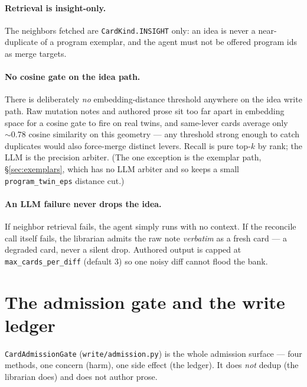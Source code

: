 \documentclass[11pt]{article}
\newcommand{\code}[1]{\texttt{\small #1}}
\begin{document}
\paragraph{Retrieval is insight-only.} The neighbors fetched are
\code{CardKind.INSIGHT} only: an idea is never a near-duplicate of a program
exemplar, and the agent must not be offered program ids as merge targets.

\paragraph{No cosine gate on the idea path.} There is deliberately \emph{no}
embedding-distance threshold anywhere on the idea write path. Raw mutation notes
and authored prose sit too far apart in embedding space for a cosine gate to
fire on real twins, and same-lever cards average only $\sim 0.78$ cosine
similarity on this geometry --- any threshold strong enough to catch duplicates
would also force-merge distinct levers. Recall is pure top-$k$ by rank; the LLM
is the precision arbiter. (The one exception is the exemplar path,
\S\ref{sec:exemplars}, which has no LLM arbiter and so keeps a small
\code{program\_twin\_eps} distance cut.)

\paragraph{An LLM failure never drops the idea.} If neighbor retrieval fails,
the agent simply runs with no context. If the reconcile call itself fails, the
librarian admits the raw note \emph{verbatim} as a fresh card --- a degraded
card, never a silent drop. Authored output is capped at
\code{max\_cards\_per\_diff} (default 3) so one noisy diff cannot flood the bank.

\section{The admission gate and the write ledger}
\label{sec:gate}

\code{CardAdmissionGate} (\code{write/admission.py}) is the whole admission
surface --- four methods, one concern (harm), one side effect (the ledger). It
does \emph{not} dedup (the librarian does) and does not author prose.
\end{document}
